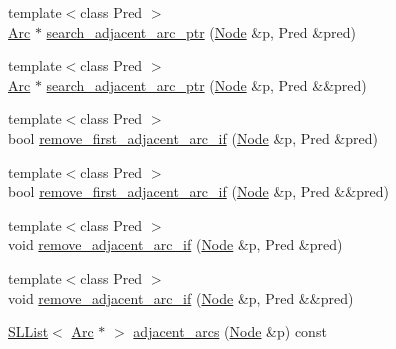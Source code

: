 \begin{DoxyCompactItemize}
\item 
{\footnotesize template$<$class Pred $>$ }\\\hyperlink{namespace_designar_a3f55fb5513d62ff47cbc8f72b8e95d6f}{Arc} $\ast$ \hyperlink{class_designar_1_1_base_graph_a4c9703fdb22d4e1d3cf0428fd705b3ee}{search\+\_\+adjacent\+\_\+arc\+\_\+ptr} (\hyperlink{namespace_designar_a5af326c65aa2bd26b26c410f2030d09e}{Node} \&p, Pred \&pred)
\item 
{\footnotesize template$<$class Pred $>$ }\\\hyperlink{namespace_designar_a3f55fb5513d62ff47cbc8f72b8e95d6f}{Arc} $\ast$ \hyperlink{class_designar_1_1_base_graph_aac7ed362d5f21fcc6e583d4b9e03babb}{search\+\_\+adjacent\+\_\+arc\+\_\+ptr} (\hyperlink{namespace_designar_a5af326c65aa2bd26b26c410f2030d09e}{Node} \&p, Pred \&\&pred)
\item 
{\footnotesize template$<$class Pred $>$ }\\bool \hyperlink{class_designar_1_1_base_graph_ab7c2c2129abb3200b854e23f34e513e8}{remove\+\_\+first\+\_\+adjacent\+\_\+arc\+\_\+if} (\hyperlink{namespace_designar_a5af326c65aa2bd26b26c410f2030d09e}{Node} \&p, Pred \&pred)
\item 
{\footnotesize template$<$class Pred $>$ }\\bool \hyperlink{class_designar_1_1_base_graph_abe36f7676c51362b9a0f560d3c062772}{remove\+\_\+first\+\_\+adjacent\+\_\+arc\+\_\+if} (\hyperlink{namespace_designar_a5af326c65aa2bd26b26c410f2030d09e}{Node} \&p, Pred \&\&pred)
\item 
{\footnotesize template$<$class Pred $>$ }\\void \hyperlink{class_designar_1_1_base_graph_af1653bc8e50c53d27997951798a8a716}{remove\+\_\+adjacent\+\_\+arc\+\_\+if} (\hyperlink{namespace_designar_a5af326c65aa2bd26b26c410f2030d09e}{Node} \&p, Pred \&pred)
\item 
{\footnotesize template$<$class Pred $>$ }\\void \hyperlink{class_designar_1_1_base_graph_a10423075ea81c629e88974fa882ec903}{remove\+\_\+adjacent\+\_\+arc\+\_\+if} (\hyperlink{namespace_designar_a5af326c65aa2bd26b26c410f2030d09e}{Node} \&p, Pred \&\&pred)
\item 
\hyperlink{class_designar_1_1_s_l_list}{S\+L\+List}$<$ \hyperlink{namespace_designar_a3f55fb5513d62ff47cbc8f72b8e95d6f}{Arc} $\ast$ $>$ \hyperlink{class_designar_1_1_base_graph_a2c91912381c8220c0b2530e5ad187231}{adjacent\+\_\+arcs} (\hyperlink{namespace_designar_a5af326c65aa2bd26b26c410f2030d09e}{Node} \&p) const
\item 

\end{DoxyCompactItemize}
